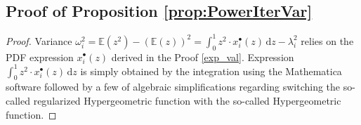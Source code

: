\subsection{Proof of Proposition \ref{prop:PowerIterVar}}
\label{exp_var}
\begin{proof}[Proof]
Variance $\omega^2_i=\mathbb{E}(z^2)-(\mathbb{E}(z))^2=\int_0^1 z^2\cdot x^\bullet_i(z) \, \mathrm{d}z - \lambda^2_i$ relies on the PDF expression $x^\bullet_i(z)$ derived in the Proof \ref{exp_val}. Expression $\int_0^1 z^2\cdot x^\bullet_i(z) \, \mathrm{d}z$ is simply obtained by the integration using the Mathematica software  followed by a few of algebraic simplifications regarding switching the so-called regularized Hypergeometric function with the so-called Hypergeometric function.
\end{proof}

